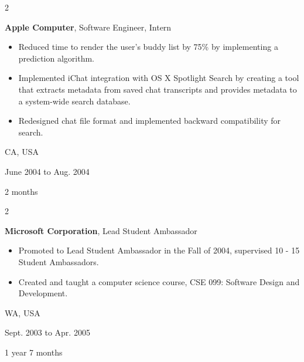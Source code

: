 \documentclass[10pt, letterpaper]{article}
\newenvironment{highlights}{
    \begin{itemize}[
        topsep=0.10 cm,
        parsep=0.10 cm,
        partopsep=0pt,
        itemsep=0pt,
        leftmargin=0.4 cm + 10pt
    ]
}{
    \end{itemize}
} %
\newenvironment{twocolentry}[2][]{
    \onecolentry
    \def\secondColumn{#2}
    \setcolumnwidth{\fill, 4.5 cm}
    \begin{paracol}{2}
}{
    \switchcolumn \raggedleft \secondColumn
    \end{paracol}
    \endonecolentry
} %
\begin{document}
        
        \begin{twocolentry}{
            CA, USA

        June 2004 to Aug. 2004

        2 months
        }
            \textbf{Apple Computer}, Software Engineer, Intern
            \begin{highlights}
                \item Reduced time to render the user's buddy list by 75\% by implementing a prediction algorithm.
                \item Implemented iChat integration with OS X Spotlight Search by creating a tool that extracts metadata from saved chat transcripts and provides metadata to a system-wide search database.
                \item Redesigned chat file format and implemented backward compatibility for search.
            \end{highlights}
        \end{twocolentry}


        \vspace{0.2 cm}

        \begin{twocolentry}{
            WA, USA

        Sept. 2003 to Apr. 2005

        1 year 7 months
        }
            \textbf{Microsoft Corporation}, Lead Student Ambassador
            \begin{highlights}
                \item Promoted to Lead Student Ambassador in the Fall of 2004, supervised 10 - 15 Student Ambassadors.
                \item Created and taught a computer science course, CSE 099: Software Design and Development.
            \end{highlights}
        \end{twocolentry}


        \vspace{0.2 cm}
\end{document}
